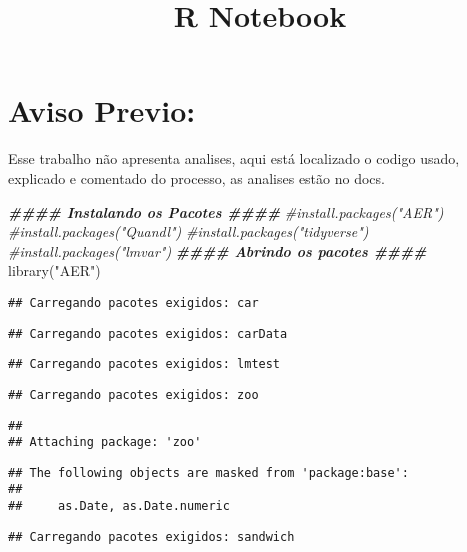\documentclass[
]{article}
\title{R Notebook}
\author{}
\date{\vspace{-2.5em}}
\newenvironment{Shaded}{\begin{snugshade}}{\end{snugshade}}
\newcommand{\CommentTok}[1]{\textcolor[rgb]{0.56,0.35,0.01}{\textit{#1}}}
\newcommand{\DocumentationTok}[1]{\textcolor[rgb]{0.56,0.35,0.01}{\textbf{\textit{#1}}}}
\newcommand{\FunctionTok}[1]{\textcolor[rgb]{0.00,0.00,0.00}{#1}}
\newcommand{\NormalTok}[1]{#1}
\newcommand{\StringTok}[1]{\textcolor[rgb]{0.31,0.60,0.02}{#1}}
\begin{document}
\maketitle

\hypertarget{aviso-previo}{%
\section{Aviso Previo:}\label{aviso-previo}}

Esse trabalho não apresenta analises, aqui está localizado o codigo
usado, explicado e comentado do processo, as analises estão no docs.

\begin{Shaded}
\begin{Highlighting}[]
\DocumentationTok{\#\#\#\# Instalando os Pacotes \#\#\#\#}
\CommentTok{\#install.packages("AER")}
\CommentTok{\#install.packages("Quandl")}
\CommentTok{\#install.packages("tidyverse")}
\CommentTok{\#install.packages("lmvar")}
\DocumentationTok{\#\#\#\# Abrindo os pacotes \#\#\#\#}
\FunctionTok{library}\NormalTok{(}\StringTok{"AER"}\NormalTok{)}
\end{Highlighting}
\end{Shaded}

\begin{verbatim}
## Carregando pacotes exigidos: car
\end{verbatim}

\begin{verbatim}
## Carregando pacotes exigidos: carData
\end{verbatim}

\begin{verbatim}
## Carregando pacotes exigidos: lmtest
\end{verbatim}

\begin{verbatim}
## Carregando pacotes exigidos: zoo
\end{verbatim}

\begin{verbatim}
## 
## Attaching package: 'zoo'
\end{verbatim}

\begin{verbatim}
## The following objects are masked from 'package:base':
## 
##     as.Date, as.Date.numeric
\end{verbatim}

\begin{verbatim}
## Carregando pacotes exigidos: sandwich
\end{verbatim}
\end{document}
